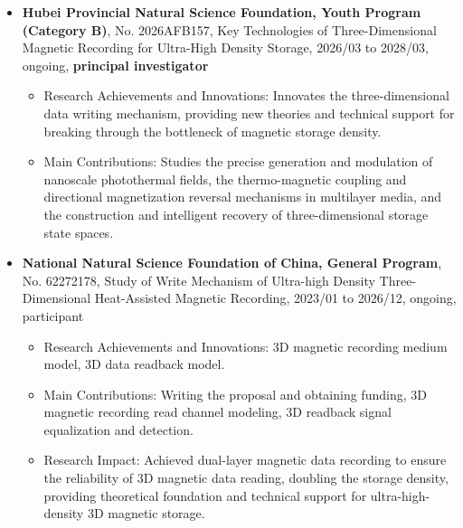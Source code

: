 \documentclass[en]{resume}
\begin{document}
\begin{itemize}
  \item \textbf{Hubei Provincial Natural Science Foundation, Youth Program (Category B)}, No. 2026AFB157,
  Key Technologies of Three-Dimensional Magnetic Recording for Ultra-High Density Storage, 2026/03 to 2028/03, ongoing, \textbf{principal investigator}
  \begin{itemize}
    \item Research Achievements and Innovations: Innovates the three-dimensional data writing mechanism, providing new theories and technical support for breaking through the bottleneck of magnetic storage density.
    \item Main Contributions: Studies the precise generation and modulation of nanoscale photothermal fields, the thermo-magnetic coupling and directional magnetization reversal mechanisms in multilayer media, and the construction and intelligent recovery of three-dimensional storage state spaces.
  \end{itemize}

  \item \textbf{National Natural Science Foundation of China, General Program}, No. 62272178, 
  Study of Write Mechanism of Ultra-high Density Three-Dimensional Heat-Assisted Magnetic Recording, 2023/01 to 2026/12, ongoing, participant
  \begin{itemize}
    \item Research Achievements and Innovations: 3D magnetic recording medium model, 3D data readback model.
    \item Main Contributions: Writing the proposal and obtaining funding, 3D magnetic recording read channel modeling, 3D readback signal equalization and detection.
    \item Research Impact: Achieved dual-layer magnetic data recording to ensure the reliability of 3D magnetic data reading, doubling the storage density, providing theoretical foundation and technical support for ultra-high-density 3D magnetic storage.
  \end{itemize}


\end{itemize}
\end{document}
